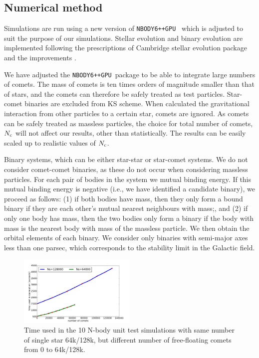 \documentclass[usenatbib]{mn2e}
\newcommand{\ncomets}{N_{\rm c}}
\newcommand{\nb}{\texttt{NBODY6++GPU}}
\begin{document}
\subsection{Numerical method}

Simulations are run using a new version of \nb\ \citep{Wang:2015ab} which is adjusted to suit the purpose of our simulations. Stellar evolution and binary evolution are implemented following the prescriptions of Cambridge stellar evolution package and the improvements \citep{Eggleton:1989aa, Hurley:2000aa, Hurley:2005aa, Belczynski:2007aa}.

We have adjusted the \nb\ package to be able to integrate large numbers of comets. The mass of comets is ten times orders of magnitude smaller than that of stars, and the comets can therefore be safely treated as test particles. Star-comet binaries are excluded from KS scheme. When calculated the gravitational interaction from other particles to a certain star, comets are ignored. %
As comets can be safely treated as massless particles, the choice for total number of comets, $\ncomets$ will not affect our results, other than statistically. The results can be easily scaled up to realistic values of $\ncomets$. 

Binary systems, which can be either star-star or star-comet systems. We do not consider comet-comet binaries, as these do not occur when considering massless particles. For each pair of bodies in the system we mutual binding energy. If this mutual binding energy is negative (i.e., we have identified a candidate binary), we proceed as follows: (1) if both bodies have mass, then they only form a bound binary if they are each other's mutual nearest neighbours with mass;, and (2) if only one body has mass, then the two bodies only form a binary if the body with mass is the nearest body with mass of the massless particle. We then obtain the orbital elements of each binary. We consider only binaries with semi-major axes less than one parsec, which corresponds to the stability limit in the Galactic field. 

\begin{figure}
  \centering
  \includegraphics[width=0.5\textwidth,height=!]{time_used.pdf}
  \caption{Time used in the 10 N-body unit test simulations with same number of single star 64k/128k, but different number of free-floating comets from 0 to 64k/128k.}
  \label{fig:time_used}
\end{figure}
\end{document}
